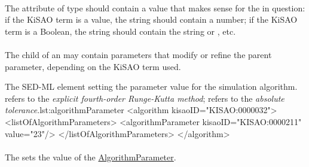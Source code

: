 \paragraph*{}
The attribute  of type  should contain a value that makes sense for the  in question:  if the KiSAO term is a value, the string should contain a number; if the KiSAO term is a Boolean, the string should contain the string  or , etc.

\begin{blockChanged}
\paragraph*{}
The child  of an \AlgorithmParameter may contain parameters that modify or refine the parent parameter, depending on the KiSAO term used.  
\end{blockChanged}

\begin{myXmlLst}{The SED-ML  element setting the parameter value for the simulation algorithm.  refers to the \emph{explicit fourth-order Runge-Kutta method};  refers to the \emph{absolute tolerance}.}{lst:algorithmParameter}
<algorithm kisaoID="KISAO:0000032"> 
	<listOfAlgorithmParameters> 
		<algorithmParameter kisaoID="KISAO:0000211" value="23"/> 
	</listOfAlgorithmParameters> 
</algorithm>
\end{myXmlLst}


\paragraph*{}
\label{sec:algorithmParameterValue}
The  sets the value of the \hyperref[class:algorithmParameter]{AlgorithmParameter}.

